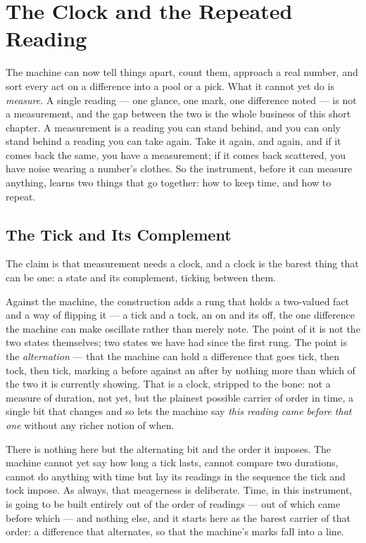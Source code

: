 \chapter{The Clock and the Repeated Reading}

The machine can now tell things apart, count them, approach a real number, and sort every act on a difference
into a pool or a pick. What it cannot yet do is \emph{measure}. A single reading --- one glance, one mark, one
difference noted --- is not a measurement, and the gap between the two is the whole business of this short
chapter. A measurement is a reading you can stand behind, and you can only stand behind a reading you can take
again. Take it again, and again, and if it comes back the same, you have a measurement; if it comes back
scattered, you have noise wearing a number's clothes. So the instrument, before it can measure anything, learns
two things that go together: how to keep time, and how to repeat.

\section{The Tick and Its Complement}

The claim is that measurement needs a clock, and a clock is the barest thing that can be one: a state and its
complement, ticking between them.

Against the machine, the construction adds a rung that holds a two-valued fact and a way of flipping it --- a
tick and a tock, an on and its off, the one difference the machine can make oscillate rather than merely note.
The point of it is not the two states themselves; two states we have had since the first rung. The point is the
\emph{alternation} --- that the machine can hold a difference that goes tick, then tock, then tick, marking a
before against an after by nothing more than which of the two it is currently showing. That is a clock, stripped
to the bone: not a measure of duration, not yet, but the plainest possible carrier of order in time, a single
bit that changes and so lets the machine say \emph{this reading came before that one} without any richer notion
of when.

There is nothing here but the alternating bit and the order it imposes. The machine cannot yet say how long a
tick lasts, cannot compare two durations, cannot do anything with time but lay its readings in the sequence the
tick and tock impose. As always, that meagerness is deliberate. Time, in this instrument, is going to be built
entirely out of the order of readings --- out of which came before which --- and nothing else, and it starts here
as the barest carrier of that order: a difference that alternates, so that the machine's marks fall into a line.

